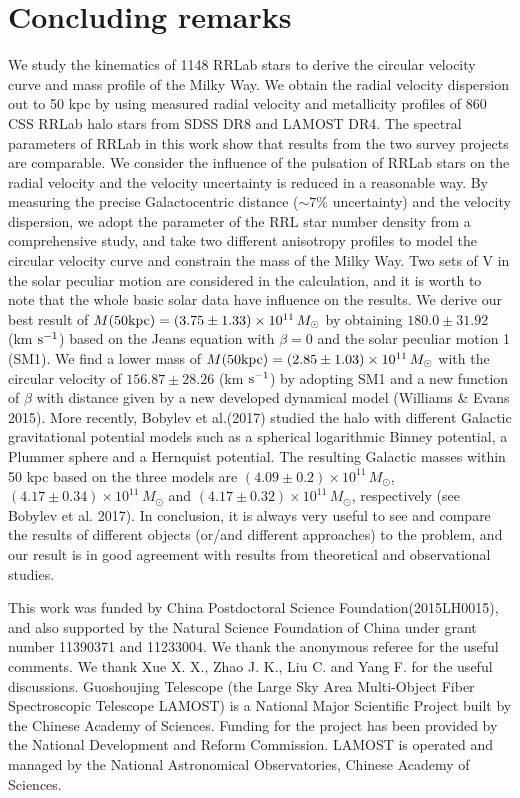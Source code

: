 \documentclass[12pt,preprint]{aastex}
\begin{document}
\section{Concluding remarks}

We study the kinematics of 1148 RRLab stars to derive the circular velocity curve and mass profile of the Milky Way. We obtain the radial velocity dispersion out to 50 kpc by using measured radial velocity and metallicity profiles of 860 CSS RRLab halo stars from SDSS DR8 and LAMOST DR4. The spectral parameters of RRLab in this work show that results from the two survey projects are comparable. We consider the influence of the pulsation of RRLab stars on the radial velocity and the velocity uncertainty is reduced in a reasonable way. By measuring the precise Galactocentric distance ($\sim 7\%$ uncertainty) and the velocity dispersion, we adopt the parameter of the RRL star number density from a comprehensive study, and take two different anisotropy profiles to model the circular velocity curve and constrain the mass of the Milky Way. Two sets of V in the solar peculiar motion are considered in the calculation, and it is worth to note that the whole basic solar data have influence on the results. We derive our best result of $M(50 {\rm kpc}) = (3.75\pm1.33)\times10^{11}\,M_\odot$ by obtaining $180.0\pm31.92$ (km $\rm s^{-1}$) based on the Jeans equation with $\beta = 0$ and the solar peculiar motion 1 (SM1). We find a lower mass of $M(50 {\rm kpc}) = (2.85\pm1.03)\times10^{11}\,M_\odot$ with the circular velocity of $156.87\pm28.26$ (km $\rm s^{-1}$) by adopting SM1 and a new function of $\beta$ with distance given by a new developed dynamical model (Williams \& Evans 2015). More recently,  Bobylev et al.(2017) studied the halo with different Galactic gravitational potential models such as a spherical logarithmic Binney potential, a Plummer sphere and a Hernquist potential. The resulting Galactic masses within 50 kpc based on the three models are $(4.09\pm0.2)\times10^{11}\,M_\odot$, $(4.17\pm0.34)\times10^{11}\,M_\odot$ and $(4.17\pm0.32)\times10^{11}\,M_\odot$, respectively (see Bobylev et al. 2017). In conclusion, it is always very useful to see and compare the results of different objects (or/and different approaches) to the problem, and our result is in good agreement with results from theoretical and observational studies.

\acknowledgments This work was funded by China Postdoctoral Science Foundation(2015LH0015),
and also supported by the Natural Science
Foundation of China under grant number 11390371 and 11233004. We thank the anonymous referee for the useful comments. We thank Xue X. X., Zhao J. K., Liu C. and Yang F. for the useful discussions.
Guoshoujing Telescope (the Large Sky Area Multi-Object Fiber Spectroscopic Telescope LAMOST) is a National Major Scientific Project built by the Chinese Academy of Sciences. Funding for the project has been provided by the National Development and Reform Commission. LAMOST is operated and managed by the National Astronomical Observatories, Chinese Academy of Sciences.
\end{document}
